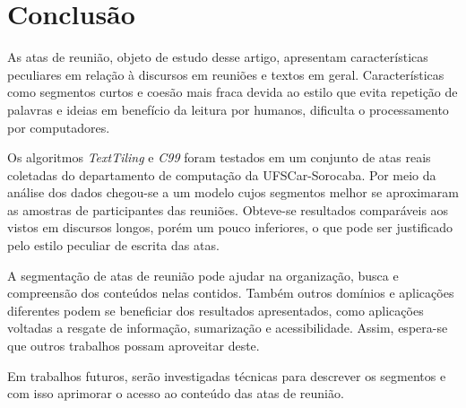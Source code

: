\section{Conclusão}
	\label{sec:conclusao}
	
	As atas de reunião, objeto de estudo desse artigo, apresentam características peculiares em relação à discursos em reuniões e textos em geral. Características como segmentos curtos e coesão mais fraca devida ao estilo que evita repetição de palavras e ideias em benefício da leitura por humanos, dificulta o processamento por computadores.



	Os algoritmos \textit{TextTiling} e \textit{C99} foram testados em um conjunto de atas reais coletadas do departamento de computação da UFSCar-Sorocaba. Por meio da análise dos dados chegou-se a um modelo cujos segmentos melhor se aproximaram as amostras de participantes das reuniões. Obteve-se resultados comparáveis aos vistos em discursos longos, porém um pouco inferiores, o que pode ser justificado pelo estilo peculiar de escrita das atas.	


	A segmentação de atas de reunião pode ajudar na organização, busca e compreensão dos conteúdos nelas contidos. Também outros domínios e aplicações diferentes podem se beneficiar dos resultados apresentados, como aplicações voltadas a resgate de informação, sumarização e acessibilidade. Assim, espera-se que outros trabalhos possam aproveitar deste.
	
	
	Em trabalhos futuros, serão investigadas técnicas para descrever os segmentos e com isso aprimorar o acesso ao conteúdo das atas de reunião.



